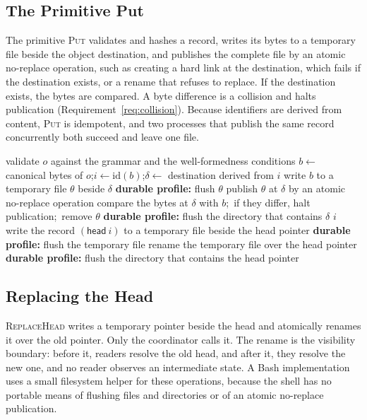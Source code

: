 \documentclass[11pt,a4paper]{article}
\theoremstyle{plain}
\theoremstyle{definition}
\theoremstyle{remark}
\theoremstyle{definition}
\newcommand{\hid}{\mathrm{id}}
\begin{document}
\subsection{The Primitive Put}

The primitive \textsc{Put} validates and hashes a record, writes its bytes to a temporary file beside the object destination, and publishes the complete file by an atomic no-replace operation, such as creating a hard link at the destination, which fails if the destination exists, or a rename that refuses to replace. If the destination exists, the bytes are compared. A byte difference is a collision and halts publication (Requirement~\ref{req:collision}). Because identifiers are derived from content, \textsc{Put} is idempotent, and two processes that publish the same record concurrently both succeed and leave one file.

\begin{algorithm}
\caption{The primitives \textsc{Put} and \textsc{ReplaceHead}.}
\label{alg:primitives}
\begin{algorithmic}[1]
  \State validate $o$ against the grammar and the well-formedness conditions
  \State $b \gets$ canonical bytes of $o$;\quad $i \gets \hid(b)$;\quad $\delta \gets$ destination derived from $i$
  \State write $b$ to a temporary file $\theta$ beside $\delta$
  \State \textbf{durable profile:} flush $\theta$
  \State publish $\theta$ at $\delta$ by an atomic no-replace operation
    \State compare the bytes at $\delta$ with $b$;\ if they differ, halt publication;\ remove $\theta$
  \EndIf
  \State \textbf{durable profile:} flush the directory that contains $\delta$
  \State \Return $i$
\EndFunction
\Statex
{} 
  \State write the record $(\mathsf{head}\ i)$ to a temporary file beside the head pointer
  \State \textbf{durable profile:} flush the temporary file
  \State rename the temporary file over the head pointer
  \State \textbf{durable profile:} flush the directory that contains the head pointer
\EndFunction
\end{algorithmic}
\end{algorithm}

\subsection{Replacing the Head}

\textsc{ReplaceHead} writes a temporary pointer beside the head and atomically renames it over the old pointer. Only the coordinator calls it. The rename is the visibility boundary: before it, readers resolve the old head, and after it, they resolve the new one, and no reader observes an intermediate state. A Bash implementation uses a small filesystem helper for these operations, because the shell has no portable means of flushing files and directories or of an atomic no-replace publication.
\end{document}
